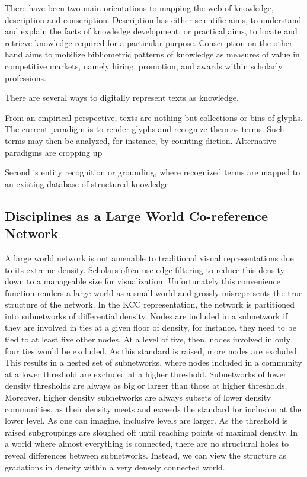 \documentclass[]{book}
\theoremstyle{definition}
\theoremstyle{definition}
\theoremstyle{definition}
\theoremstyle{remark}
\begin{document}
There have been two main orientations to mapping the web of knowledge,
description and conscription. Description has either scientific aims, to
understand and explain the facts of knowledge development, or practical
aims, to locate and retrieve knowledge required for a particular
purpose. Conscription on the other hand aims to mobilize bibliometric
patterns of knowledge as measures of value in competitive markets,
namely hiring, promotion, and awards within scholarly professions.

There are several ways to digitally represent texts as knowledge.

From an empirical perspective, texts are nothing but collections or bins
of glyphs. The current paradigm is to render glyphs and recognize them
as terms. Such terms may then be analyzed, for instance, by counting
diction. Alternative paradigms are cropping up

Second is entity recognition or grounding, where recognized terms are
mapped to an existing database of structured knowledge.

\citep{Pilkington2009evolution}

\hypertarget{disciplines-as-a-large-world-co-reference-network}{%
\subsection{Disciplines as a Large World Co-reference
Network}\label{disciplines-as-a-large-world-co-reference-network}}

A large world network is not amenable to traditional visual
representations due to its extreme density. Scholars often use edge
filtering to reduce this density down to a manageable size for
visualization. Unfortunately this convenience function renders a large
world as a small world and grossly misrepresents the true structure of
the network. In the KCC representation, the network is partitioned into
subnetworks of differential density. Nodes are included in a subnetwork
if they are involved in ties at a given floor of density, for instance,
they need to be tied to at least five other nodes. At a level of five,
then, nodes involved in only four ties would be excluded. As this
standard is raised, more nodes are excluded. This results in a nested
set of subnetworks, where nodes included in a community at a lower
threshold are excluded at a higher threshold. Subnetworks of lower
density thresholds are always as big or larger than those at higher
thresholds. Moreover, higher density subnetworks are always subsets of
lower density communities, as their density meets and exceeds the
standard for inclusion at the lower level. As one can imagine, inclusive
levels are larger. As the threshold is raised subgroupings are sloughed
off until reaching points of maximal density. In a world where almost
everything is connected, there are no structural holes to reveal
differences between subnetworks. Instead, we can view the structure as
gradations in density within a very densely connected world.
\end{document}
